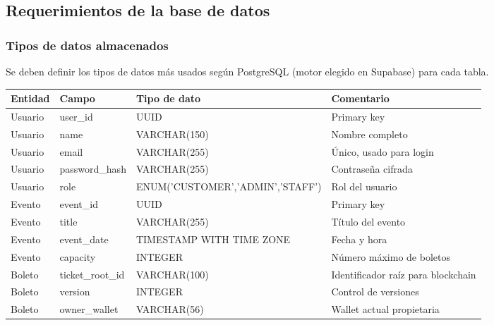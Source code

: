 \documentclass[12pt,letterpaper]{article}
\begin{document}
\subsection{Requerimientos de la base de datos}
\subsubsection{Tipos de datos almacenados}
Se deben definir los tipos de datos más usados según PostgreSQL (motor elegido en Supabase) para cada tabla.
\begin{table}[H]
\centering
\tiny
\renewcommand{\arraystretch}{1.05}
\setlength{\tabcolsep}{3pt}

\begin{tabularx}{\textwidth}{|l|l|l|X|}
\hline
\textbf{Entidad} & \textbf{Campo} & \textbf{Tipo de dato} & \textbf{Comentario} \\ \hline

Usuario     & user\_id       & UUID                             & Primary key                        \\ \hline
Usuario     & name           & VARCHAR(150)                     & Nombre completo                    \\ \hline
Usuario     & email          & VARCHAR(255)                     & Único, usado para login            \\ \hline
Usuario     & password\_hash & VARCHAR(255)                     & Contraseña cifrada                 \\ \hline
Usuario     & role           & ENUM('CUSTOMER','ADMIN','STAFF') & Rol del usuario                    \\ \hline

Evento      & event\_id       & UUID                             & Primary key                        \\ \hline
Evento      & title           & VARCHAR(255)                     & Título del evento                  \\ \hline
Evento      & event\_date     & TIMESTAMP WITH TIME ZONE         & Fecha y hora                       \\ \hline
Evento      & capacity        & INTEGER                          & Número máximo de boletos           \\ \hline

Boleto      & ticket\_root\_id & VARCHAR(100)                     & Identificador raíz para blockchain \\ \hline
Boleto      & version        & INTEGER                          & Control de versiones               \\ \hline
Boleto      & owner\_wallet   & VARCHAR(56)                      & Wallet actual propietaria          \\ \hline


\end{tabularx}
\end{table}
\end{document}
